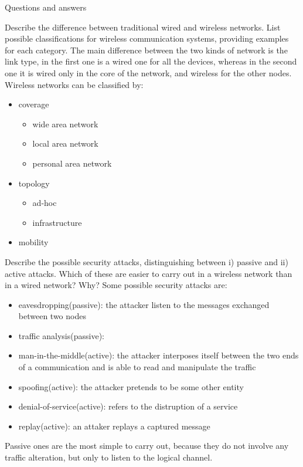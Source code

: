 \begin{section}{Questions and answers}
  \begin{subsubsection}{Describe the difference between traditional wired and wireless networks.
      List possible classifications for wireless communication systems, providing examples for each
    category.}
    The main difference between the two kinds of network is the link type, in the first one is a
    wired one for all the devices, whereas in the second one it is wired only in the core of the
    network, and wireless for the other nodes.\\
    Wireless networks can be classified by: 
    \begin{itemize}
      \item coverage 
        \begin{itemize}
          \item wide area network
          \item local area network 
          \item personal area network
        \end{itemize}
      \item topology 
        \begin{itemize}
          \item ad-hoc 
          \item infrastructure
        \end{itemize}
      \item mobility
    \end{itemize}
  \end{subsubsection}

  \begin{subsubsection}{Describe the possible security attacks, distinguishing between i) passive
      and ii) active attacks. Which of these are easier to carry out in a wireless network than in a
    wired network? Why?}
    \label{ssec:prev1}
    Some possible security attacks are: 
    \begin{itemize}
      \item eavesdropping(passive): the attacker listen to the messages exchanged between two nodes
      \item traffic analysis(passive):
      \item man-in-the-middle(active): the attacker interposes itself between the two ends of a
        communication and is able to read and manipulate the traffic
      \item spoofing(active): the attacker pretends to be some other entity
      \item denial-of-service(active): refers to the distruption of a service
      \item replay(active): an attaker replays a captured message
    \end{itemize}
    Passive ones are the most simple to carry out, because they do not involve any traffic
    alteration, but only to listen to the logical channel.
  \end{subsubsection}


\end{section}

